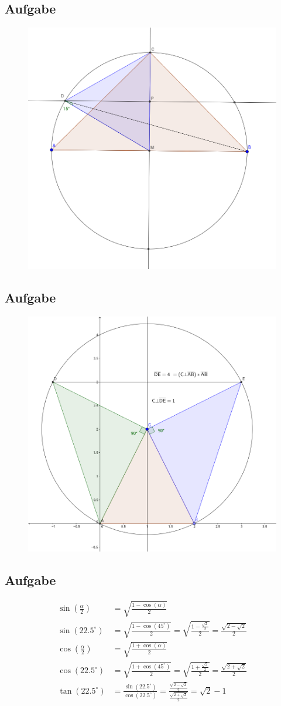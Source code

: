 \documentclass[a4paper,10pt]{article}
\begin{document}
\subsection{Aufgabe} %
\begin{figure}[H]
	\centering
	\includegraphics[width=.5\linewidth]{res/KL161-4.png}
\end{figure}

\subsection{Aufgabe} %
\begin{figure}[H]
	\centering
	\includegraphics[width=.5\linewidth]{res/KL161-5.png}
\end{figure}

\subsection{Aufgabe} %
\begin{align*}
\sin(\frac{\alpha}{2}) &= \sqrt{\frac{1 - \cos(\alpha)}{2}} \\
\sin(22.5^\circ) &= \sqrt{\frac{1 - \cos(45^\circ)}{2}} = \sqrt{\frac{1 - \frac{\sqrt{2}}{2}}{2}} = \frac{\sqrt{2 - \sqrt{2}}}{2} \\
\cos(\frac{\alpha}{2}) &= \sqrt{\frac{1 + \cos(\alpha)}{2}} \\
\cos(22.5^\circ) &= \sqrt{\frac{1 + \cos(45^\circ)}{2}} = \sqrt{\frac{1 + \frac{\sqrt{2}}{2}}{2}} = \frac{\sqrt{2 + \sqrt{2}}}{2} \\
\tan(22.5^\circ) &= \frac{\sin(22.5^\circ)}{\cos(22.5^\circ)} = \frac{\frac{\sqrt{2 - \sqrt{2}}}{2}}{\frac{\sqrt{2 + \sqrt{2}}}{2}} = \sqrt{2} - 1
\end{align*}
\end{document}
